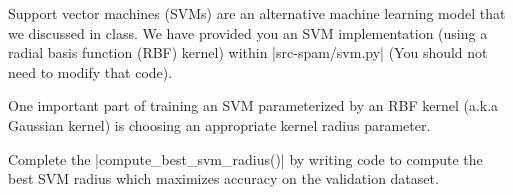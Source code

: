 \item {}
Support vector machines (SVMs) are an alternative machine learning model that we discussed in class.
We have provided you an SVM implementation (using a radial basis function (RBF) kernel) within |src-spam/svm.py| (You should not need to modify that code).

One important part of training an SVM parameterized by an RBF kernel (a.k.a Gaussian kernel) is choosing an appropriate kernel radius parameter.

Complete the |compute_best_svm_radius()| by writing code to compute the best SVM radius which maximizes accuracy on the validation dataset.